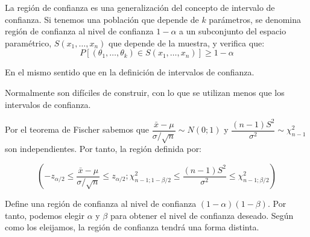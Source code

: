 
La regi\'on de confianza es una generalizaci\'on del concepto de intervalo de confianza. Si tenemos una poblaci\'on que depende de $k$ par\'ametros, se denomina regi\'on de confianza al nivel de confianza $1-\alpha$ a un subconjunto del espacio param\'etrico, $S(x_1,\ldots,x_n)$ que depende de la muestra, y verifica que:
\begin{equation*}
P\left[(\theta_1,\ldots,\theta_k)\in S(x_1,\ldots,x_n)\right]\geq 1-\alpha
\end{equation*}

En el mismo sentido que en la definici\'on de intervalos de confianza.

Normalmente son dif\'iciles de construir, con lo que se utilizan menos que los intervalos de confianza.

Por el teorema de Fischer sabemos que $\dfrac{\bar{x}-\mu}{\sigma/\sqrt{n}}\sim N(0;1)$ y $\dfrac{(n-1)S^2}{\sigma^2}\sim\chi^2_{n-1}$ son independientes. Por tanto, la regi\'on definida por:

\begin{equation*}
\left(-z_{\alpha/2}\leq\dfrac{\bar{x}-\mu}{\sigma/\sqrt{n}}\leq z_{\alpha/2};\chi^2_{n-1;1-\beta/2}\leq\dfrac{(n-1)S^2}{\sigma^2}\leq\chi^2_{n-1;\beta/2}\right)
\end{equation*}

Define una regi\'on de confianza al nivel de confianza $(1-\alpha)(1-\beta)$. Por tanto, podemos elegir $\alpha$ y $\beta$ para obtener el nivel de confianza deseado. Seg\'un como los eleijamos, la regi\'on de confianza tendr\'a una forma distinta.